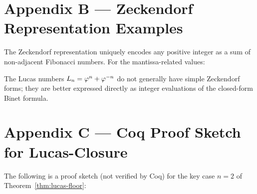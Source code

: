 \section{Appendix B — Zeckendorf Representation Examples}
\label{sec:appendix-b}

The Zeckendorf representation uniquely encodes any positive integer
as a sum of non-adjacent Fibonacci numbers.  For the mantissa-related
values:

\begin{center}
\end{center}

The Lucas numbers \(L_n = \varphi^{n}+\varphi^{-n}\) do not generally
have simple Zeckendorf forms; they are better expressed directly as
integer evaluations of the closed-form Binet formula.

\section{Appendix C — Coq Proof Sketch for Lucas-Closure}
\label{sec:appendix-c}

The following is a proof sketch (not verified by Coq) for the
key case \(n = 2\) of Theorem~\ref{thm:lucas-floor}:

